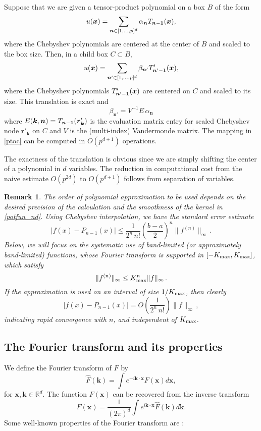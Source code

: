 \documentclass[final,letterpaper]{siamart171218}
\newtheorem{remark}[theorem]{Remark}
\newcommand{\be}{\begin{equation}}
\newcommand{\ee}{\end{equation}}
\newcommand{\x}{\boldsymbol{x}}
\newcommand{\bk}{\boldsymbol{k}}
\newcommand{\bn}{\boldsymbol{n}}
\newcommand{\br}{\boldsymbol{r}}
\begin{document}
\begin{lemma} \label{ptoclemma}
Suppose that we are given a tensor-product polynomial 
on a box $B$ of the form
\[ u(\x) =
\sum_{\bn \in [1,\dots,p]^d} \alpha_{\bn} T_{\bn-{\bf 1}}(\x),
\]
where the Chebyshev polynomials are centered at the center of $B$ and scaled to the
box size.  Then, in a child box $C \subset B$,  
\[ u(\x) =
\sum_{\bn' \in [1,\dots,p]^d} \beta_{\bn'} T'_{\bn'-{\bf 1}}(\x),
\]
where the Chebyshev polynomials $T'_{\bn'-{\bf 1}}(\x)$ are
centered on $C$ and scaled to its size.
This translation is exact and 
\be \label{ptoc} 
\beta_{\bn'} = V^{-1} E \, \alpha_{\bn}
\ee
where $E(\bk,\bn) = T_{\bn-{\bf 1}}(\br'_{\bk})$ is the evaluation matrix
entry for scaled Chebyshev node $\br'_{\bk}$ on $C$ and $V$ is the
(multi-index) Vandermonde matrix. The mapping in
\eqref{ptoc} can be computed in $O(p^{d+1})$ operations.
\end{lemma}

The exactness of the translation is obvious since we are simply shifting the center
of a polynomial in $d$ variables. The reduction in computational cost from 
the naive estimate $O(p^{2d})$ to $O(p^{d+1})$ follows from
separation of variables. 

\begin{remark} \label{polyerror}
The order of polynomial approximation to be used 
depends on the desired precision of the calculation and the smoothness of the kernel
in \eqref{potfun_nd}.
Using Chebyshev interpolation, we have the 
standard error estimate \cite{powell1981,trefethenatap}
\[ |f(x) - P_{n-1}(x)| \leq \frac{1}{2^n \, n!} \left( \frac{b-a}{2} \right)^n 
\| f^{(n)} \|_\infty  \, .
\]
Below, we will focus on the systematic use of band-limited (or approximately 
band-limited) functions, whose Fourier transform is supported in
$[-K_{\rm max},K_{\rm max}]$, which satisfy 
\[ \| f^{(n)}\|_\infty \leq K_{\rm max}^n \| f \|_\infty  \, .
\]
If the approximation is used on an interval of size $1/K_{\rm max}$, then clearly
\[ |f(x) - P_{n-1}(x)| = O \left( \frac{1}{2^n \, n!} \right)
\| f \|_\infty  \, ,
\]
indicating rapid convergence with $n$, and {\em independent of $K_{\rm max}$}. 
\end{remark}

\subsection{The Fourier transform and its properties} \label{sec:ft}

We define the Fourier transform of $F$ by
\be
\label{fourierdef}
\widehat{F}(\bk) = \int e^{-i\bk\cdot \x} F(\x) d\x,
\ee
for $\x, \bk\in \mathbb{R}^d$.
The function $F(\x)$ can be recovered from the inverse transform
\be
\label{fourierinvdef}
F(\x) =\frac{1}{(2\pi)^d} \int e^{i\bk\cdot \x} \widehat{F}(\bk) d\bk.
\ee
Some well-known properties of the Fourier transform are
\cite{dym1975,trefethen2000}:
\end{document}

